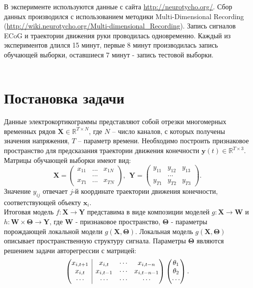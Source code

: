 \documentclass[12pt,twoside]{article}
\begin{document}
В эксперименте используются данные с сайта \url{http://neurotycho.org/}. Сбор данных производился с использованием методики Multi-Dimensional Recording (\url{http://wiki.neurotycho.org/Multi-dimensional_Recording}). Запись сигналов ECoG и траектории движения руки проводилась одновременно. Каждый из экспериментов длился 15 минут, первые 8 минут производилась запись обучающей выборки, оставшиеся 7 минут - запись тестовой выборки. \\\\

\section{Постановка задачи}
Данные электрокортикограммы представляют собой отрезки многомерных временных рядов $\mathbf{X} \in \mathbb{R}^{T \times N}$, где $N$ – число каналов, с которых получены значения напряжения, $T$ – параметр времени. Необходимо построить признаковое пространство для предсказания траектории движения конечности $\mathbf{y}(t) \in \mathbb{R}^{T \times 3}$. \\
Матрицы обучающей выборки имеют вид:
\begin{equation}
\mathbf{X}=
\begin{pmatrix}
x_{11}&...&x_{1N}\\
&...&\\
x_{T1}&...&x_{TN}
\end{pmatrix},\ \
\mathbf{Y}=
\begin{pmatrix}
y_{11}&y_{12}&y_{13}\\
&...&\\
y_{T1}&y_{T2}&y_{T3}
\end{pmatrix}.
\end{equation} 
Значение $y_{ij}$ отвечает $j$-й координате траектории движения конечности, соответствующей объекту $\mathbf{x}_i$.\\
Итоговая модель $f:\mathbf{X}\to\mathbf{Y}$ представима в виде композиции моделей $g: \mathbf{X} \to \mathbf{W}$ и $h: \mathbf{W}\times\mathbf{\Theta} \to \mathbf{Y}$, где $\mathbf{W}$ - признаковое пространство, $\mathbf{\Theta}$ - параметры порождающей локальной модели $g(\mathbf{X}, \mathbf{\Theta})$. Локальная модель $g(\mathbf{X}, \mathbf{\Theta})$ описывает пространственную структуру сигнала. Параметры $\mathbf{\Theta}$ являются решением задачи авторегрессии с матрицей:
\begin{equation}
\left(\begin{array}{@{}c|ccc@{}}
x_{i, t+1} & x_{i, t}   & \cdots & x_{i, t-n}   \\
x_{i, t}   & x_{i, t-1} & \cdots & x_{i, t-n-1} \\
\cdots     & \cdots     & \cdots & \cdots
\end{array}\right)
\begin{pmatrix}
\theta_1 \\
\theta_2 \\
\cdots
\end{pmatrix}.
\end{equation}
\end{document}
